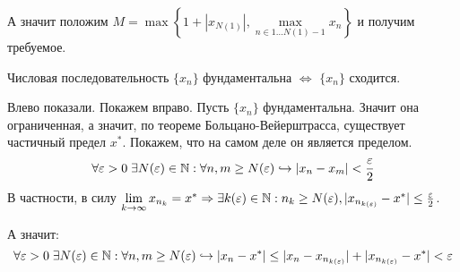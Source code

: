 А значит положим $M = \max \left\{1 + |x_{N(1)}|, \max\limits_{n \in 1 \dots N(1) - 1} x_n  \right\}$ и получим требуемое.

\Endproof

 Числовая последовательность $\{x_n\}$ фундаментальна $\iff$ $\{x_n\}$ сходится.

\Proof

Влево показали. Покажем вправо. Пусть $\{x_n\}$ фундаментальна. Значит она ограниченная, а значит, по теореме Больцано-Вейерштрасса, существует частичный предел $x^*$.
Покажем, что на самом деле он является пределом.
\begin{equation*}
    \forall \varepsilon > 0 \; \exists N(\varepsilon) \in \mathbb{N}: \forall n, m \geq N(\varepsilon) \hookrightarrow |x_n - x_m| < \frac{\varepsilon}{2}
\end{equation*}
В частности, в силу $\lim\limits_{k \to \infty} x_{n_k} = x^* \Rightarrow \exists k(\varepsilon) \in \mathbb{N}: n_k \geq N(\varepsilon), |x_{n_{k(\varepsilon)}} - x^*| \leq \frac{\varepsilon}{2}$.

А значит:
\begin{equation*}
    \forall \varepsilon > 0 \; \exists N(\varepsilon) \in \mathbb{N}: \forall n, m \geq N(\varepsilon) \hookrightarrow |x_n - x^*| \leq |x_n - x_{n_{k(\varepsilon)}}| + |x_{n_{k(\varepsilon)}} - x^*| < \varepsilon
\end{equation*}

\Endproof

